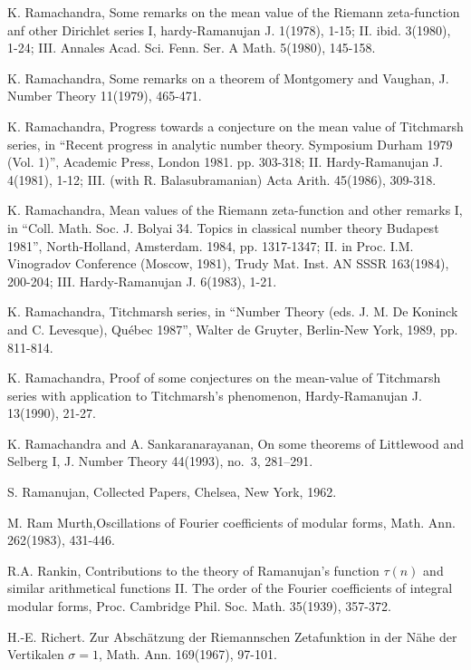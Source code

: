 \begin{thebibliography}{99}
 K. Ramachandra, Some remarks on the mean value of the Riemann zeta-function anf other Dirichlet series I, hardy-Ramanujan J. 1(1978), 1-15; II. ibid. 3(1980), 1-24; III. Annales Acad. Sci. Fenn. Ser. A Math. 5(1980), 145-158.

 K. Ramachandra, Some remarks on a theorem of Montgomery and Vaughan, J. Number Theory 11(1979), 465-471.

 K. Ramachandra, Progress towards a conjecture on the mean value of Titchmarsh series, in ``Recent progress in analytic number theory. Symposium Durham 1979 (Vol. 1)'', Academic Press, London 1981. pp. 303-318; II. Hardy-Ramanujan J. 4(1981), 1-12; III. (with R. Balasubramanian) Acta Arith. 45(1986), 309-318. 

 K. Ramachandra, Mean values of the Riemann zeta-function and other remarks I, in ``Coll. Math. Soc. J. Bolyai 34. Topics in classical number theory Budapest 1981'', North-Holland, Amsterdam. 1984, pp. 1317-1347; II. in Proc. I.M. Vinogradov Conference (Moscow, 1981), Trudy Mat. Inst. AN SSSR 163(1984), 200-204; III. Hardy-Ramanujan J. 6(1983), 1-21.

 K. Ramachandra, Titchmarsh series, in ``Number Theory (eds. J. M. De Koninck and C. Levesque), Qu\'ebec 1987'', Walter de Gruyter, Berlin-New York, 1989, pp. 811-814.

 K. Ramachandra, Proof of some conjectures on the mean-value of Titchmarsh series with application to Titchmarsh's phenomenon, Hardy-Ramanujan J. 13(1990), 21-27.

 K. Ramachandra and A. Sankaranarayanan, On some theorems of Littlewood and Selberg I, J. Number Theory 44(1993), no.~3, 281--291.

 S. Ramanujan, Collected Papers, Chelsea, New York, 1962.

 M. Ram Murth,\pageoriginale Oscillations of Fourier coefficients of modular forms, Math. Ann. 262(1983), 431-446.

 R.A. Rankin, Contributions to the theory of Ramanujan's function $\tau(n)$ and similar arithmetical functions II. The order of the Fourier coefficients of integral modular forms, Proc. Cambridge Phil. Soc. Math. 35(1939), 357-372.

 H.-E. Richert. Zur Absch\"atzung der Riemannschen Zetafunktion in der N\"ahe der Vertikalen $\sigma =1$, Math. Ann. 169(1967), 97-101.


\end{thebibliography}
